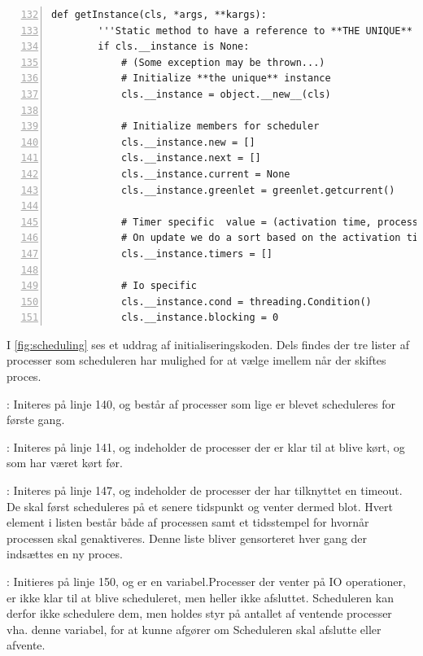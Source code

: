 \begin{lstlisting}[firstnumber=132,stepnumber=5,numbers=left, float, label=fig:scheduling, caption=Uddrag af Scheduler]
    def getInstance(cls, *args, **kargs):
        '''Static method to have a reference to **THE UNIQUE** instance'''
        if cls.__instance is None:
            # (Some exception may be thrown...)
            # Initialize **the unique** instance
            cls.__instance = object.__new__(cls)

            # Initialize members for scheduler
            cls.__instance.new = []
            cls.__instance.next = []
            cls.__instance.current = None
            cls.__instance.greenlet = greenlet.getcurrent()

            # Timer specific  value = (activation time, process)
            # On update we do a sort based on the activation time
            cls.__instance.timers = []

            # Io specific
            cls.__instance.cond = threading.Condition()
            cls.__instance.blocking = 0
\end{lstlisting}


 I \cref{fig:scheduling} ses et uddrag af initialiseringskoden. Dels findes der tre lister af processer som scheduleren har mulighed for at vælge imellem når der skiftes proces.  
 \begin{list}
 \tightlist 
 \item {}: Initeres på linje 140, og består af processer som lige er blevet scheduleres for første gang.
 \item {}: Initeres på linje 141, og indeholder de processer der er klar til at blive kørt, og som har været kørt før.  
 \item {}: Initeres på linje 147, og indeholder de processer der har tilknyttet en timeout. De skal først scheduleres på et senere tidspunkt og venter dermed blot. Hvert element i listen består både af processen samt et tidsstempel for hvornår processen skal genaktiveres. Denne liste bliver gensorteret hver gang der indsættes en ny proces.
 \item {}: Initieres på linje 150, og er en variabel.Processer der venter på IO operationer, er ikke klar til at blive scheduleret, men heller ikke afsluttet. Scheduleren kan derfor ikke schedulere dem, men holdes styr på antallet af ventende processer vha. denne variabel, for at kunne afgører om Scheduleren skal afslutte eller afvente.
\end{list}

